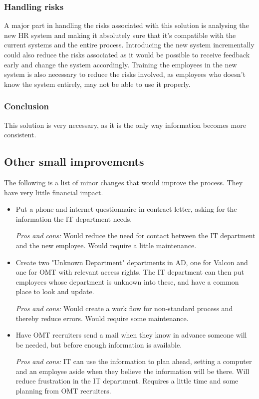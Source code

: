 \subsubsection{Handling risks}
A major part in handling the risks associated with this solution is analysing the new HR system and making it absolutely sure that it's compatible with the current systems and the entire process. 
Introducing the new system incrementally could also reduce the risks associated as it would be possible to receive feedback early and change the system accordingly. 
Training the employees in the new system is also necessary to reduce the risks involved, as employees who doesn't know the system entirely, may not be able to use it properly.

\subsubsection{Conclusion} 
This solution is very necessary, as it is the only way information becomes more consistent.

\subsection{Other small improvements}
The following is a list of minor changes that would improve the process.
They have very little financial impact.
\begin{itemize}
\item Put a phone and internet questionnaire in contract letter, asking for the information the IT department needs.

\emph{Pros and cons:} Would reduce the need for contact between the IT department and the new employee.
Would require a little maintenance.

\item Create two "Unknown Department" departments in AD, one for Valcon and one for OMT with relevant access rights. The IT department can then put employees whose department is unknown into these, and have a common place to look and update.

\emph{Pros and cons:} Would create a work flow for non-standard process and thereby reduce errors. Would require some maintenance.

\item Have OMT recruiters send a mail when they know in advance someone will be needed, but before enough information is available.

\emph{Pros and cons:} IT can use the information to plan ahead, setting a computer and an employee aside when they believe the information will be there. Will reduce frustration in the IT department. Requires a little time and some planning from OMT recruiters.
\end{itemize}

